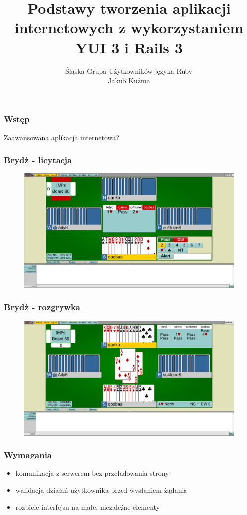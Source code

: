 \documentclass[16pt]{beamer}
\author{Śląska Grupa Użytkowników języka Ruby\\
  \footnotesize{Jakub Kuźma}}
\title{Podstawy tworzenia aplikacji internetowych z wykorzystaniem YUI 3 i Rails 3}
\begin{document}
\frame{\titlepage}

\begin{frame}
  \frametitle{Wstęp}
  \begin{center}
    Zaawansowana aplikacja internetowa?
  \end{center}
\end{frame}

\begin{frame}
  \frametitle{Brydż - licytacja}
  \begin{figure}
    \includegraphics[width=\linewidth]{bbo-auction.png}
  \end{figure}
\end{frame}

\begin{frame}
  \frametitle{Brydż - rozgrywka}
  \begin{figure}
    \includegraphics[width=\linewidth]{bbo-play.png}
  \end{figure}
\end{frame}

\begin{frame}
  \frametitle{Wymagania}
  \begin{itemize}
  \item komunikacja z serwerem bez przeładowania strony
  \item walidacja działań użytkownika przed wysłaniem żądania
  \item rozbicie interfejsu na małe, niezależne elementy
  \end{itemize}
\end{frame}
\end{document}
